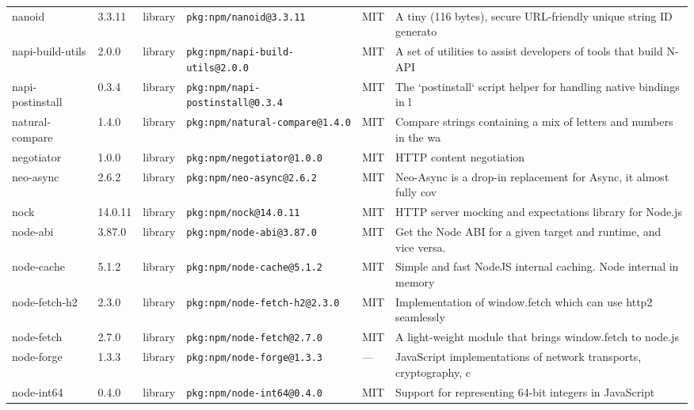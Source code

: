 \documentclass[11pt,a4paper]{article}
\begin{document}
\begin{longtable}{|p{4cm}|p{2cm}|p{1.6cm}|p{5cm}|p{1.5cm}|p{3.5cm}|}
\raggedright nanoid & 3.3.11 & library & \small\texttt{pkg:npm/nanoid@3.3.11} & MIT & \small A tiny (116 bytes), secure URL-friendly unique string ID generato \\
\raggedright napi-build-utils & 2.0.0 & library & \small\texttt{pkg:npm/napi-build-utils@2.0.0} & MIT & \small A set of utilities to assist developers of tools that build N-API \\
\raggedright napi-postinstall & 0.3.4 & library & \small\texttt{pkg:npm/napi-postinstall@0.3.4} & MIT & \small The `postinstall` script helper for handling native bindings in l \\
\raggedright natural-compare & 1.4.0 & library & \small\texttt{pkg:npm/natural-compare@1.4.0} & MIT & \small Compare strings containing a mix of letters and numbers in the wa \\
\raggedright negotiator & 1.0.0 & library & \small\texttt{pkg:npm/negotiator@1.0.0} & MIT & \small HTTP content negotiation \\
\raggedright neo-async & 2.6.2 & library & \small\texttt{pkg:npm/neo-async@2.6.2} & MIT & \small Neo-Async is a drop-in replacement for Async, it almost fully cov \\
\raggedright nock & 14.0.11 & library & \small\texttt{pkg:npm/nock@14.0.11} & MIT & \small HTTP server mocking and expectations library for Node.js \\
\raggedright node-abi & 3.87.0 & library & \small\texttt{pkg:npm/node-abi@3.87.0} & MIT & \small Get the Node ABI for a given target and runtime, and vice versa. \\
\raggedright node-cache & 5.1.2 & library & \small\texttt{pkg:npm/node-cache@5.1.2} & MIT & \small Simple and fast NodeJS internal caching. Node internal in memory  \\
\raggedright node-fetch-h2 & 2.3.0 & library & \small\texttt{pkg:npm/node-fetch-h2@2.3.0} & MIT & \small Implementation of window.fetch which can use http2 seamlessly \\
\raggedright node-fetch & 2.7.0 & library & \small\texttt{pkg:npm/node-fetch@2.7.0} & MIT & \small A light-weight module that brings window.fetch to node.js \\
\raggedright node-forge & 1.3.3 & library & \small\texttt{pkg:npm/node-forge@1.3.3} & — & \small JavaScript implementations of network transports, cryptography, c \\
\raggedright node-int64 & 0.4.0 & library & \small\texttt{pkg:npm/node-int64@0.4.0} & MIT & \small Support for representing 64-bit integers in JavaScript \\

\end{longtable}
\end{document}
